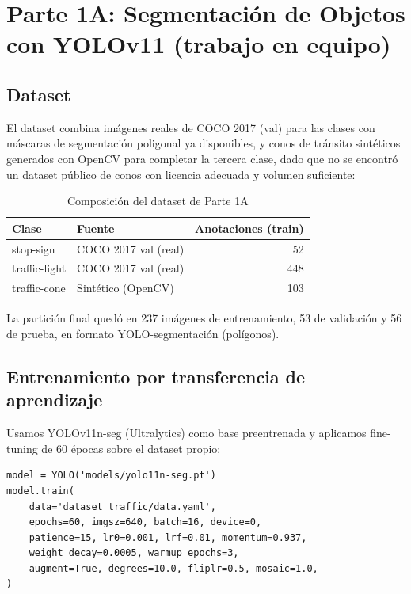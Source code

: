 \documentclass[12pt,a4paper]{article}
\let\oldsubsection\subsection
\renewcommand{\subsection}[1]{\needspace{5\baselineskip}\oldsubsection{#1}}
\begin{document}
\section{Parte 1A: Segmentación de Objetos con YOLOv11 (trabajo en equipo)}

\subsection{Dataset}

El dataset combina imágenes reales de COCO 2017 (val) para las clases con máscaras de segmentación poligonal ya disponibles, y conos de tránsito sintéticos generados con OpenCV para completar la tercera clase, dado que no se encontró un dataset público de conos con licencia adecuada y volumen suficiente:

\begin{table}[htbp]
  \centering
  \caption{Composición del dataset de Parte 1A}
  \begin{tabular}{llr}
    \toprule
    \textbf{Clase} & \textbf{Fuente} & \textbf{Anotaciones (train)} \\
    \midrule
    stop-sign     & COCO 2017 val (real)      & 52  \\
    traffic-light & COCO 2017 val (real)      & 448 \\
    traffic-cone  & Sintético (OpenCV)        & 103 \\
    \bottomrule
  \end{tabular}
  \label{tab:dataset1a}
\end{table}

La partición final quedó en 237 imágenes de entrenamiento, 53 de validación y 56 de prueba, en formato YOLO-segmentación (polígonos).

\subsection{Entrenamiento por transferencia de aprendizaje}

Usamos YOLOv11n-seg (Ultralytics) como base preentrenada y aplicamos fine-tuning de 60 épocas sobre el dataset propio:

\begin{lstlisting}[style=pystyle]
model = YOLO('models/yolo11n-seg.pt')
model.train(
    data='dataset_traffic/data.yaml',
    epochs=60, imgsz=640, batch=16, device=0,
    patience=15, lr0=0.001, lrf=0.01, momentum=0.937,
    weight_decay=0.0005, warmup_epochs=3,
    augment=True, degrees=10.0, fliplr=0.5, mosaic=1.0,
)
\end{lstlisting}
\end{document}
